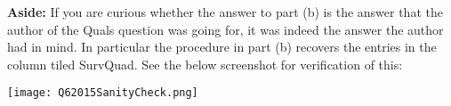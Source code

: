 \textbf{Aside:} If you are curious whether the answer to part (b) is the answer that the author of the Quals question was going for, it was indeed the answer the author had in mind. In particular the procedure in part (b) recovers the entries in the column tiled SurvQuad. See the below screenshot for verification of this:

\texttt{[image: Q62015SanityCheck.png]}


